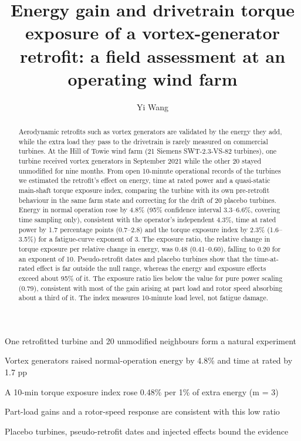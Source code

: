 \documentclass[preprint,12pt]{elsarticle}
\begin{document}
\doublespacing

\begin{frontmatter}

\title{Energy gain and drivetrain torque exposure of a vortex-generator retrofit: a field assessment at an operating wind farm}

\author{Yi Wang}

\begin{abstract}
Aerodynamic retrofits such as vortex generators are validated by the energy they add, while the extra load they pass to the drivetrain is rarely measured on commercial turbines. At the Hill of Towie wind farm (21 Siemens SWT-2.3-VS-82 turbines), one turbine received vortex generators in September 2021 while the other 20 stayed unmodified for nine months. From open 10-minute operational records of the turbines we estimated the retrofit's effect on energy, time at rated power and a quasi-static main-shaft torque exposure index, comparing the turbine with its own pre-retrofit behaviour in the same farm state and correcting for the drift of 20 placebo turbines. Energy in normal operation rose by 4.8\% (95\% confidence interval 3.3--6.6\%, covering time sampling only), consistent with the operator's independent 4.3\%, time at rated power by 1.7 percentage points (0.7--2.8) and the torque exposure index by 2.3\% (1.6--3.5\%) for a fatigue-curve exponent of 3. The exposure ratio, the relative change in torque exposure per relative change in energy, was 0.48 (0.41--0.60), falling to 0.20 for an exponent of 10. Pseudo-retrofit dates and placebo turbines show that the time-at-rated effect is far outside the null range, whereas the energy and exposure effects exceed about 95\% of it. The exposure ratio lies below the value for pure power scaling (0.79), consistent with most of the gain arising at part load and rotor speed absorbing about a third of it. The index measures 10-minute load level, not fatigue damage.
\end{abstract}

\begin{highlights}
\item One retrofitted turbine and 20 unmodified neighbours form a natural experiment
\item Vortex generators raised normal-operation energy by 4.8\% and time at rated by 1.7 pp
\item A 10-min torque exposure index rose 0.48\% per 1\% of extra energy (m = 3)
\item Part-load gains and a rotor-speed response are consistent with this low ratio
\item Placebo turbines, pseudo-retrofit dates and injected effects bound the evidence
\end{highlights}


\end{frontmatter}
\end{document}
